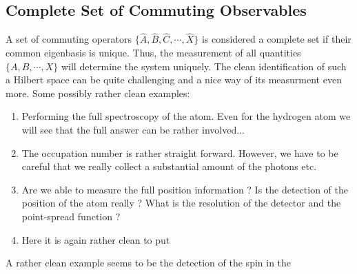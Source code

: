 \subsection{Complete Set of Commuting Observables}

A set of commuting operators $\{\hat{A},\hat{B},\hat{C},\cdots,\hat{X}\}$ is considered a complete set if their common eigenbasis is unique. Thus, the measurement of all quantities $\{A,B,\cdots,X\}$ will determine the system uniquely. The clean identification of such a Hilbert space can be quite challenging and a nice way of its measurment even more. Some possibly rather clean examples:

\begin{enumerate}
\item Performing the full spectroscopy of the atom. Even for the hydrogen atom we will see that the full answer can be rather involved...
\item The occupation number is rather straight forward. However, we have to be careful that we really collect a substantial amount of the photons etc.
\item Are we able to measure the full position information ? Is the detection of the position of the atom really ? What is the resolution of the detector and the point-spread function ?
\item Here it is again rather clean to put 
\end{enumerate}

A rather clean example seems to be the detection of the spin in the 